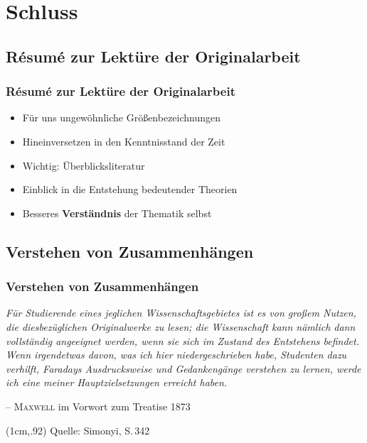 \documentclass[green,10pt]{beamer}
\newcommand{\vtiny}{\fontsize{6}{1}\selectfont}
\newcommand{\zitat}[2]{
  \textit{\frqq#1 \flqq}\\
  \begin{flushright}
    -- #2
  \end{flushright}
}
\newcommand{\quelle}[1]{
  \begin{textblock*}{\linewidth}(1cm,.92\paperheight)
    \vtiny Quelle: #1
  \end{textblock*}
}
\newcommand{\name}[1]{
  \textsc{#1}
}
\begin{document}
\section{Schluss}
  \subsection{Résumé zur Lektüre der Originalarbeit}
    \begin{frame}
      \frametitle{Résumé zur Lektüre der Originalarbeit}
      \begin{itemize}[<+->]
        \item Für uns ungewöhnliche Größenbezeichnungen
        \item Hineinversetzen in den Kenntnisstand der Zeit
        \item Wichtig: Überblicksliteratur
        \item Einblick in die Entstehung bedeutender Theorien
        \item Besseres \textbf{Verständnis} der Thematik selbst
      \end{itemize}
    \end{frame}    
  
  \subsection{Verstehen von Zusammenhängen}
    \begin{frame}
      \frametitle{Verstehen von Zusammenhängen}
      \zitat{Für Studierende eines jeglichen Wissenschaftsgebietes ist es von großem Nutzen, die diesbezüglichen Originalwerke zu lesen; die Wissenschaft kann nämlich dann vollständig angeeignet werden, wenn sie sich im Zustand des Entstehens befindet.\\
        Wenn irgendetwas davon, was ich hier niedergeschrieben habe, Studenten dazu verhilft, Faradays Ausdrucksweise und Gedankengänge verstehen zu lernen, werde ich eine meiner Hauptzielsetzungen erreicht haben.}{\name{Maxwell} im Vorwort zum Treatise 1873}
      \quelle{Simonyi, S.\,342}
    \end{frame}        
  
\end{document}
